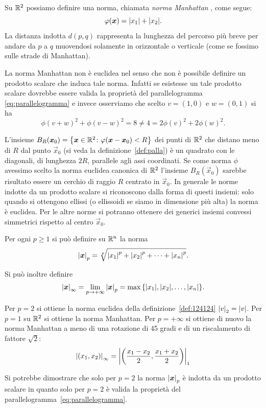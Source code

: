 \begin{example}
Su ${\mathbb R}^2$ possiamo definire una norma, chiamata \emph{norma Manhattan}%
%
,
come segue:
\[
  \varphi(\boldsymbol x) = {\left|x_1\right|} + {\left|x_2\right|}.
\]
La distanza indotta $d(p,q)$
%
%
rappresenta la lunghezza del percorso più breve per
andare da $p$ a $q$ muovendosi solamente in orizzontale o verticale
(come se fossimo sulle strade di Manhattan).

La norma Manhattan non è euclidea nel senso che non è possibile definire
un prodotto scalare che induca tale norma. Infatti se esistesse un
tale prodotto scalare dovrebbe essere valida la proprietà del parallelogramma
\eqref{eq:parallelogramma} e invece osserviamo che scelto $v=(1,0)$ e $w=(0,1)$
si ha
\[
  \phi(v+w)^2 + \phi(v-w)^2
  = 8
  \neq 4
  = 2\phi(v)^2 + 2\phi(w)^2.
\]

L'insieme $B_R(\boldsymbol x_0) = {\left\{ \boldsymbol x \in {\mathbb R}^2\colon \varphi(\boldsymbol x-\boldsymbol x_0) < R \right\}}$
dei punti di ${\mathbb R}^2$ che distano meno di $R$ dal  punto $\vec x_0$
(si veda la definizione~\ref{def:palla})
è un quadrato
con le diagonali, di lunghezza $2R$, parallele agli assi coordinati.
Se come norma $\phi$ avessimo scelto la norma euclidea canonica di ${\mathbb R}^2$
l'insieme $B_R(\vec x_0)$ sarebbe risultato essere un cerchio di raggio $R$
centrato in $\vec x_0$.
In generale le norme indotte da un prodotto scalare si riconoscono
dalla forma di questi insiemi: solo quando si ottengono ellissi
(o ellissoidi se siamo in dimensione più alta) la norma è euclidea.
Per le altre norme si potranno ottenere dei generici insiemi convessi simmetrici
rispetto al centro $\vec x_0$.
\end{example}

\begin{example}[norma $p$]
\label{ex:norma_p}%
Per ogni $p\ge 1$ si può definire su ${\mathbb R}^n$ la norma
%
%
%
\[
  {\left|\boldsymbol x\right|}_p = \sqrt[p]{{\left|x_1\right|}^p + {\left|x_2\right|}^p + \dots + {\left|x_n\right|}^p}.
\]

Si può inoltre definire
\[
  {\left|\boldsymbol x\right|}_\infty = \lim_{p\to +\infty} {\left|\boldsymbol x\right|}_p
   = \max{\left\{ {\left|x_1\right|}, {\left|x_2\right|}, \dots, {\left|x_n\right|} \right\}}.
\]

Per $p=2$ si ottiene la norma euclidea della definizione~\ref{def:124124}
${\left|v\right|}_2={\left|v\right|}$.
Per $p=1$
su ${\mathbb R}^2$ si ottiene la norma Manhattan.
Per $p=+\infty$ si ottiene di nuovo
la norma Manhattan a meno di una rotazione di 45 gradi e di un riscalamento
di fattore $\sqrt 2$:
\[
  {\left|(x_1,x_2)\right|}_\infty
  = {\left|{\left( \frac{x_1-x_2} 2, \frac {x_1+x_2}2 \right)}\right|}_1
\]

Si potrebbe dimostrare che solo per $p=2$ la norma ${\left|\boldsymbol x\right|}_p$ è indotta
da un prodotto scalare in quanto solo per $p=2$ è valida
la proprietà del parallelogramma~\eqref{eq:parallelogramma}.
\end{example}

